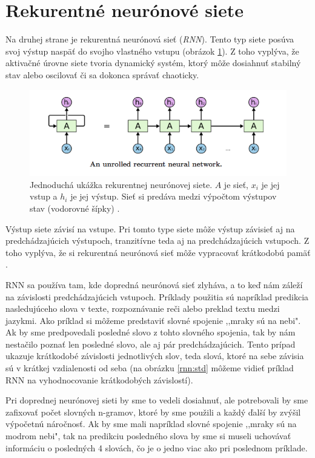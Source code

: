 \section{Rekurentné neurónové siete}
Na druhej strane je rekurentná neurónová sieť (\textit{RNN}).
Tento typ siete posúva svoj výstup naspäť do svojho vlastného vstupu (obrázok \ref{rnn}). 
Z toho vyplýva, že aktivačné úrovne siete tvoria dynamický systém, ktorý môže dosiahnuť stabilný stav alebo oscilovať či sa dokonca správať chaoticky.
\begin{figure} 
\includegraphics[width=\textwidth]{../img/rnn.png}
\caption{Jednoduchá ukážka rekurentnej neurónovej siete. $A$ je sieť, $x_i$ je jej vstup a $h_i$ je jej výstup. Sieť si predáva medzi výpočtom výstupov stav (vodorovné šípky) \citep{rnn:colah}.}
\label{rnn}
\end{figure}

Výstup siete závisí na vstupe. 
Pri tomto type siete môže výstup závisieť aj na predchádzajúcich výstupoch, tranzitívne teda aj na predchádzajúcich vstupoch.
Z toho vyplýva, že si rekurentná neurónová sieť môže vypracovať krátkodobú pamäť \citep{aima}.

RNN sa používa tam, kde dopredná neurónová sieť zlyháva, a to keď nám záleží na závislosti predchádzajúcich vstupoch. Príklady použitia sú napríklad predikcia nasledujúceho slova v texte, rozpoznávanie reči alebo preklad textu medzi jazykmi.
Ako príklad si môžeme predstaviť slovné spojenie ,,mraky sú na nebi". Ak by sme predpovedali posledné slovo z tohto slovného spojenia, tak by nám nestačilo poznať len posledné slovo, ale aj pár predchádzajúcich. Tento prípad ukazuje krátkodobé závislosti jednotlivých slov, teda slová, ktoré na sebe závisia sú v krátkej vzdialenosti od seba (na obrázku \ref{rnn:std} môžeme vidieť príklad RNN na vyhodnocovanie krátkodobých závislostí).

Pri doprednej neurónovej sieti by sme to vedeli dosiahnuť, ale potrebovali by sme zafixovať počet slovných n-gramov, ktoré by sme použili a každý ďalší by zvýšil výpočetnú náročnosť. Ak by sme mali napríklad slovné spojenie ,,mraky sú na modrom nebi", tak na predikciu posledného slova by sme si museli uchovávať informáciu o posledných 4 slovách, čo je o jedno viac ako pri poslednom príklade.

